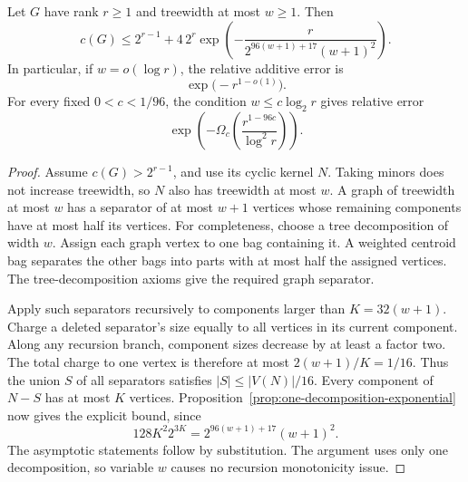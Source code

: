 \begin{corollary}
\label{cor:treewidth-exponential-error}
Let $G$ have rank $r\ge1$ and treewidth at most $w\ge1$.
Then
\[
 c(G)\le2^{r-1}+4\,2^r
 \exp\!\left(-\frac{r}{2^{96(w+1)+17}(w+1)^2}\right).
\]
In particular, if $w=o(\log r)$, the relative additive error is
\[
 \exp\bigl(-r^{1-o(1)}\bigr).
\]
For every fixed $0<c<1/96$, the condition $w\le c\log_2r$ gives relative error
\[
 \exp\!\left(-\Omega_c\!\left(\frac{r^{1-96c}}{\log^2r}\right)\right).
\]
\end{corollary}

\begin{proof}
Assume $c(G)>2^{r-1}$, and use its cyclic kernel $N$.
Taking minors does not increase treewidth, so $N$ also has treewidth at most $w$.
A graph of treewidth at most $w$ has a separator of at most $w+1$ vertices whose remaining components have at most half its vertices.
For completeness, choose a tree decomposition of width $w$.
Assign each graph vertex to one bag containing it.
A weighted centroid bag separates the other bags into parts with at most half the assigned vertices.
The tree-decomposition axioms give the required graph separator.

Apply such separators recursively to components larger than $K=32(w+1)$.
Charge a deleted separator's size equally to all vertices in its current component.
Along any recursion branch, component sizes decrease by at least a factor two.
The total charge to one vertex is therefore at most $2(w+1)/K=1/16$.
Thus the union $S$ of all separators satisfies $|S|\le|V(N)|/16$.
Every component of $N-S$ has at most $K$ vertices.
Proposition~\ref{prop:one-decomposition-exponential} now gives the explicit bound, since
\[
 128K^2 2^{3K}=2^{96(w+1)+17}(w+1)^2.
\]
The asymptotic statements follow by substitution.
The argument uses only one decomposition, so variable $w$ causes no recursion monotonicity issue.
\end{proof}

